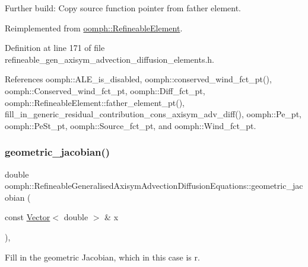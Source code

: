 Further build\+: Copy source function pointer from father element. 



Reimplemented from \hyperlink{classoomph_1_1RefineableElement_a26628ce36dfad028686adeb4694a9ef3}{oomph\+::\+Refineable\+Element}.



Definition at line 171 of file refineable\+\_\+gen\+\_\+axisym\+\_\+advection\+\_\+diffusion\+\_\+elements.\+h.



References oomph\+::\+A\+L\+E\+\_\+is\+\_\+disabled, oomph\+::conserved\+\_\+wind\+\_\+fct\+\_\+pt(), oomph\+::\+Conserved\+\_\+wind\+\_\+fct\+\_\+pt, oomph\+::\+Diff\+\_\+fct\+\_\+pt, oomph\+::\+Refineable\+Element\+::father\+\_\+element\+\_\+pt(), fill\+\_\+in\+\_\+generic\+\_\+residual\+\_\+contribution\+\_\+cons\+\_\+axisym\+\_\+adv\+\_\+diff(), oomph\+::\+Pe\+\_\+pt, oomph\+::\+Pe\+St\+\_\+pt, oomph\+::\+Source\+\_\+fct\+\_\+pt, and oomph\+::\+Wind\+\_\+fct\+\_\+pt.

\mbox{\label{classoomph_1_1RefineableGeneralisedAxisymAdvectionDiffusionEquations_a56cf6ea0f73a5a3fb80e44d56c31f852}} 
\subsubsection{\texorpdfstring{geometric\+\_\+jacobian()}{geometric\_jacobian()}}
{\footnotesize\ttfamily double oomph\+::\+Refineable\+Generalised\+Axisym\+Advection\+Diffusion\+Equations\+::geometric\+\_\+jacobian (\begin{DoxyParamCaption}\item[{const \hyperlink{classoomph_1_1Vector}{Vector}$<$ double $>$ \&}]{x }\end{DoxyParamCaption})\hspace{0.3cm}{\ttfamily [inline]}, {\ttfamily [virtual]}}



Fill in the geometric Jacobian, which in this case is r. 



